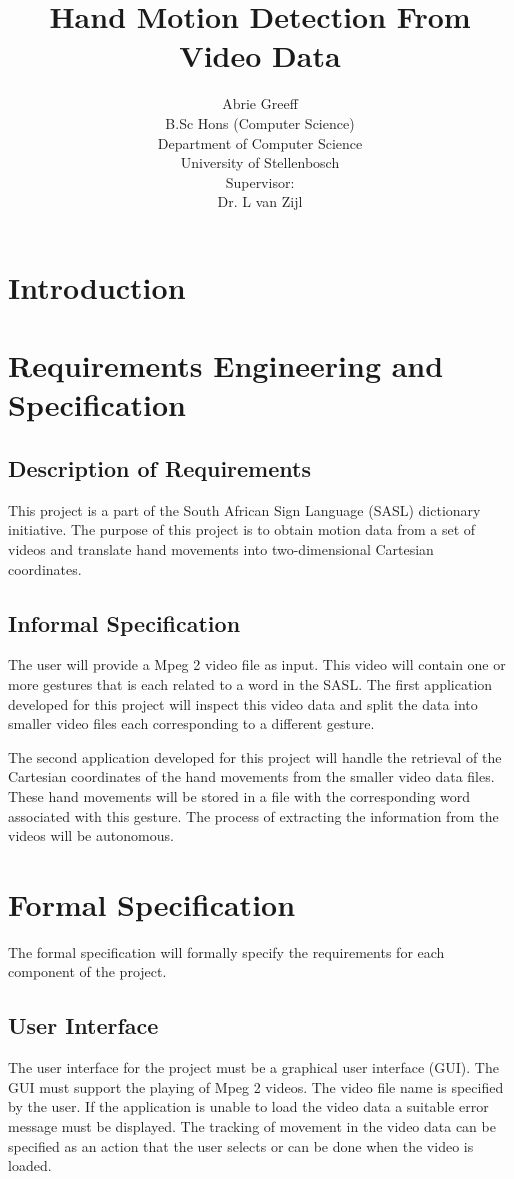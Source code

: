 \documentclass[a4paper,11pt,titlepage]{article}
\author{Abrie Greeff\\B.Sc Hons (Computer Science)\\Department of Computer Science\\University of Stellenbosch\\Supervisor:\\Dr. L van Zijl}
\title{Hand Motion Detection From Video Data}
\begin{document}
\maketitle
\tableofcontents
\newpage
\section{Introduction}
\newpage
\section{Requirements Engineering and Specification}
\subsection{Description of Requirements}
This project is a part of the South African Sign Language (SASL) dictionary initiative. The purpose of this project is to obtain motion data from a set of videos and translate hand movements into two-dimensional Cartesian coordinates.

\subsection{Informal Specification}
The user will provide a Mpeg 2 video file as input. This video will contain one or more gestures that is each related to a word in the SASL. The first application developed for this project will inspect this video data and split the data into smaller video files each corresponding to a different gesture.

The second application developed for this project will handle the retrieval of the Cartesian coordinates of the hand movements from the smaller video data files. These hand movements will be stored in a file with the corresponding word associated with this gesture. The process of extracting the information from the videos will be autonomous.

\newpage
\section{Formal Specification}
The formal specification will formally specify the requirements for each component of the project.

\subsection{User Interface}
The user interface for the project must be a graphical user interface (GUI). The GUI must support the playing of Mpeg 2 videos. The video file name is specified by the user. If the application is unable to load the video data a suitable error message must be displayed. The tracking of movement in the video data can be specified as an action that the user selects or can be done when the video is loaded.
\end{document}
